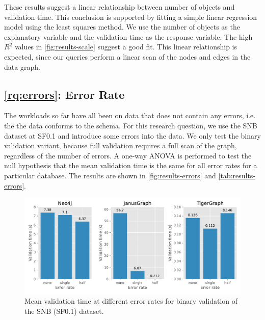 \documentclass{report}
\theoremstyle{definition}
\begin{document}
These results suggest a linear relationship between number of objects and validation time. This conclusion is supported by fitting a simple linear regression model using the least squares method. We use the number of objects as the explanatory variable and the validation time as the response variable. The high $R^2$ values in \autoref{fig:results-scale} suggest a good fit. This linear relationship is expected, since our queries perform a linear scan of the nodes and edges in the data graph.

\subsection{\ref*{rq:errors}: Error Rate}

The workloads so far have all been on data that does not contain any errors, i.e. the the data conforms to the schema. For this research question, we use the SNB dataset at SF0.1 and introduce some errors into the data. We only test the binary validation variant, because full validation requires a full scan of the graph, regardless of the number of errors. A one-way ANOVA is performed to test the null hypothesis that the mean validation time is the same for all error rates for a particular database. The results are shown in \autoref{fig:results-errors} and \autoref{tab:results-errors}.

\begin{figure}[t]
  \centering
  \includegraphics[scale=0.5]{figures/results-errors.pdf}
  \caption[Mean validation time at different error rates]{Mean validation time at different error rates for binary validation of the SNB (SF0.1) dataset.}
  \label{fig:results-errors}
\end{figure}
\end{document}
